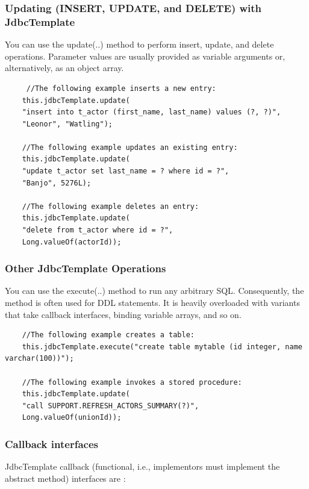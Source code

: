 \documentclass{scrartcl}
\begin{document}
\subsubsection{Updating (INSERT, UPDATE, and DELETE) with JdbcTemplate}

You can use the update(..) method to perform insert, update, and delete operations. Parameter values are usually provided as variable arguments or, alternatively, as an object array.

\begin{lstlisting}
     //The following example inserts a new entry:
    this.jdbcTemplate.update(
    "insert into t_actor (first_name, last_name) values (?, ?)",
    "Leonor", "Watling");

    //The following example updates an existing entry:
    this.jdbcTemplate.update(
    "update t_actor set last_name = ? where id = ?",
    "Banjo", 5276L);

    //The following example deletes an entry:
    this.jdbcTemplate.update(
    "delete from t_actor where id = ?",
    Long.valueOf(actorId));
\end{lstlisting}

\subsubsection{Other JdbcTemplate Operations}

You can use the execute(..) method to run any arbitrary SQL. Consequently, the method is often used for DDL statements. It is heavily overloaded with variants that take callback interfaces, binding variable arrays, and so on.

\begin{lstlisting}
    //The following example creates a table:
    this.jdbcTemplate.execute("create table mytable (id integer, name varchar(100))");

    //The following example invokes a stored procedure:
    this.jdbcTemplate.update(
    "call SUPPORT.REFRESH_ACTORS_SUMMARY(?)",
    Long.valueOf(unionId));
\end{lstlisting}

\subsubsection{Callback interfaces }

JdbcTemplate callback (functional, i.e., implementors must implement the abstract method) interfaces are :
\end{document}
